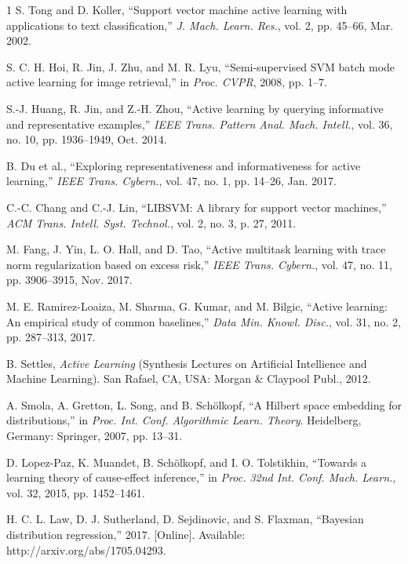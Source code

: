 \documentclass[10pt,twocolumn]{IEEEtran}
\begin{document}
\begin{thebibliography}{1}
		S. Tong and D. Koller, ``Support vector machine active learning with applications to text classification,'' \emph{J. Mach. Learn. Res.}, vol. 2, pp. 45--66, Mar. 2002.
		
		S. C. H. Hoi, R. Jin, J. Zhu, and M. R. Lyu, ``Semi-supervised SVM batch mode active learning for image retrieval,'' in \emph{Proc. CVPR}, 2008, pp. 1--7.
		
		S.-J. Huang, R. Jin, and Z.-H. Zhou, ``Active learning by querying informative and representative examples,'' \emph{IEEE Trans. Pattern Anal. Mach. Intell.}, vol. 36, no. 10, pp. 1936--1949, Oct. 2014.
		
		B. Du et al., ``Exploring representativeness and informativeness for active learning,'' \emph{IEEE Trans. Cybern.}, vol. 47, no. 1, pp. 14--26, Jan. 2017.
		
		C.-C. Chang and C.-J. Lin, ``LIBSVM: A library for support vector machines,'' \emph{ACM Trans. Intell. Syst. Technol.}, vol. 2, no. 3, p. 27, 2011.
		
		M. Fang, J. Yin, L. O. Hall, and D. Tao, ``Active multitask learning with trace norm regularization based on excess risk,'' \emph{IEEE Trans. Cybern.}, vol. 47, no. 11, pp. 3906--3915, Nov. 2017.
		
		M. E. Ramirez-Loaiza, M. Sharma, G. Kumar, and M. Bilgic, ``Active learning: An empirical study of common baselines,'' \emph{Data Min. Knowl. Disc.}, vol. 31, no. 2, pp. 287--313, 2017.
		
		B. Settles, \emph{Active Learning} (Synthesis Lectures on Artificial Intellience and Machine Learning). San Rafael, CA, USA: Morgan \& Claypool Publ., 2012.
		
		A. Smola, A. Gretton, L. Song, and B. Schölkopf, ``A Hilbert space embedding for distributions,'' in \emph{Proc. Int. Conf. Algorithmic Learn. Theory}. Heidelberg, Germany: Springer, 2007, pp. 13--31.
		
		D. Lopez-Paz, K. Muandet, B. Schölkopf, and I. O. Tolstikhin, ``Towards a learning theory of cause-effect inference,'' in \emph{Proc. 32nd Int. Conf. Mach. Learn.}, vol. 32, 2015, pp. 1452--1461.
		
		H. C. L. Law, D. J. Sutherland, D. Sejdinovic, and S. Flaxman, ``Bayesian distribution regression,'' 2017. [Online]. Available: http://arxiv.org/abs/1705.04293.
		

\end{thebibliography}
\end{document}
